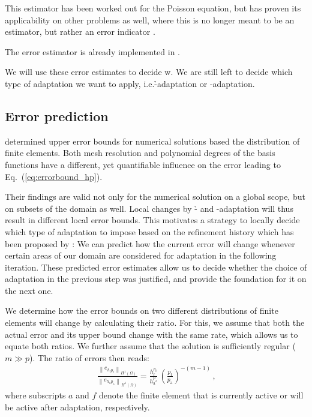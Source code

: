 This estimator has been worked out for the Poisson equation, but has proven its applicability on other problems as well, where this is no longer meant to be an estimator, but rather an error indicator \cite{dealiikelly}.

The error estimator is already implemented in \dealii{} \cite{dealiikelly}.

We will use these error estimates to decide w. We are still left to decide which type of adaptation we want to apply, i.e.\@ \h-adaptation or \p-adaptation.



\subsection{Error prediction}
\label{ssec:prediction}

\cite{babuska1990} determined upper error bounds for numerical solutions based the distribution of finite elements. Both mesh resolution and polynomial degrees of the basis functions have a different, yet quantifiable influence on the error leading to Eq.~(\ref{eq:errorbound_hp}).

Their findings are valid not only for the numerical solution on a global scope, but on subsets of the domain as well. Local changes by \h- and \p-adaptation will thus result in different local error bounds. This motivates a strategy to locally decide which type of adaptation to impose based on the refinement history which has been proposed by \textcite{melenk2001}: We can predict how the current error will change whenever certain areas of our domain are considered for adaptation in the following iteration. These predicted error estimates allow us to decide whether the choice of adaptation in the previous step was justified, and provide the foundation for it on the next one.

We determine how the error bounds on two different distributions of finite elements will change by calculating their ratio. For this, we assume that both the actual error and its upper bound change with the same rate, which allows us to equate both ratios. We further assume that the solution is sufficiently regular ($m \gg p$). The ratio of errors then reads:
\begin{align}
\label{eq:errorratio_hp} \frac{\left\|e_{h_\text{f} p_\text{f}}\right\|_{H^{1}(\Omega)}}{\left\|e_{h_\text{a} p_\text{a}}\right\|_{H^{1}(\Omega)}} = \frac{h_\text{f}^{p_\text{f}}}{h_\text{a}^{p_\text{a}}} \, \left(\frac{p_\text{f}}{p_\text{a}}\right)^{-(m-1)} \,\text{,}
\end{align}
where subscripts $a$ and $f$ denote the finite element that is currently active or will be active after adaptation, respectively.


